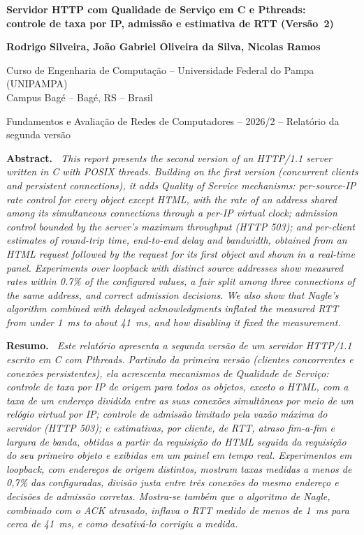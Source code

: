\documentclass[12pt,a4paper]{article}
\newenvironment{resumo}[1]%
  {\par\vspace{6pt}\noindent\begin{list}{}{\setlength{\leftmargin}{0.8cm}\setlength{\rightmargin}{0.8cm}}%
   \item[]\textbf{#1.}\itshape\ }%
  {\end{list}}
\begin{document}
\begin{center}
{\fontsize{16}{19}\selectfont\bfseries Servidor HTTP com Qualidade de Serviço em C e Pthreads:\\
controle de taxa por IP, admissão e estimativa de RTT (Versão~2)\par}
\vspace{12pt}
{\bfseries Rodrigo Silveira, João Gabriel Oliveira da Silva, Nicolas Ramos\par}
\vspace{6pt}
Curso de Engenharia de Computação -- Universidade Federal do Pampa (UNIPAMPA)\\
Campus Bagé -- Bagé, RS -- Brasil\par
\vspace{4pt}
Fundamentos e Avaliação de Redes de Computadores -- 2026/2 -- Relatório da segunda versão\par
\end{center}

\begin{resumo}{Abstract}
This report presents the second version of an HTTP/1.1 server written in C with POSIX
threads. Building on the first version (concurrent clients and persistent connections),
it adds Quality of Service mechanisms: per-source-IP rate control for every object except
HTML, with the rate of an address shared among its simultaneous connections through a
per-IP virtual clock; admission control bounded by the server's maximum throughput
(HTTP 503); and per-client estimates of round-trip time, end-to-end delay and bandwidth,
obtained from an HTML request followed by the request for its first object and shown in a
real-time panel. Experiments over loopback with distinct source addresses show measured
rates within 0.7\% of the configured values, a fair split among three connections of the
same address, and correct admission decisions. We also show that Nagle's algorithm combined
with delayed acknowledgments inflated the measured RTT from under 1~ms to about 41~ms, and
how disabling it fixed the measurement.
\end{resumo}

\begin{resumo}{Resumo}
Este relatório apresenta a segunda versão de um servidor HTTP/1.1 escrito em C com
Pthreads. Partindo da primeira versão (clientes concorrentes e conexões persistentes), ela
acrescenta mecanismos de Qualidade de Serviço: controle de taxa por IP de origem para todos
os objetos, exceto o HTML, com a taxa de um endereço dividida entre as suas conexões
simultâneas por meio de um relógio virtual por IP; controle de admissão limitado pela vazão
máxima do servidor (HTTP 503); e estimativas, por cliente, de RTT, atraso fim-a-fim e
largura de banda, obtidas a partir da requisição do HTML seguida da requisição do seu
primeiro objeto e exibidas em um painel em tempo real. Experimentos em loopback, com
endereços de origem distintos, mostram taxas medidas a menos de 0,7\% das configuradas,
divisão justa entre três conexões do mesmo endereço e decisões de admissão corretas.
Mostra-se também que o algoritmo de Nagle, combinado com o ACK atrasado, inflava o RTT
medido de menos de 1~ms para cerca de 41~ms, e como desativá-lo corrigiu a medida.
\end{resumo}
\end{document}
